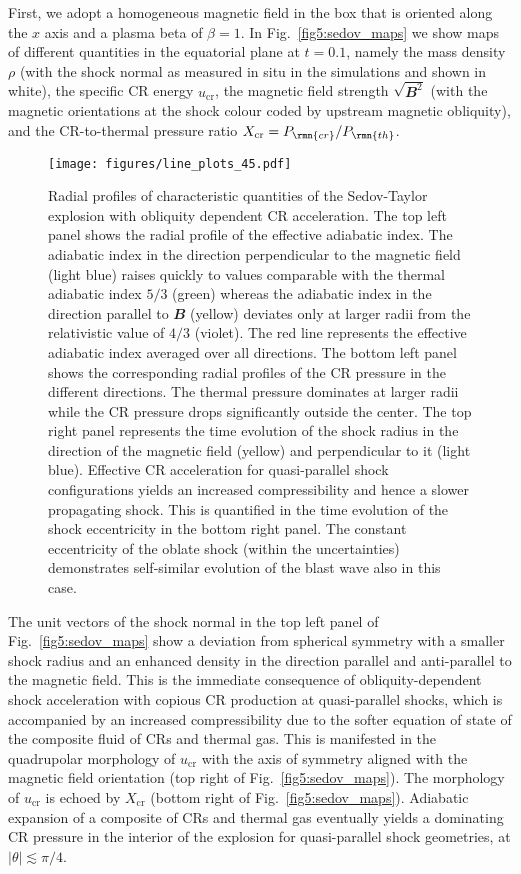 \documentclass[8pt,a4paper,usenatbib]{mnras}
\newcommand{\CR}{\rmn{cr}}
\renewcommand{\th}{\rmn{th}}
\newcommand{\vecbf}{\mathbfit}
\begin{document}
First, we adopt a homogeneous magnetic field in the box that is oriented along
the $x$ axis and a plasma beta of $\beta=1$. In Fig.~\ref{fig5:sedov_maps}
we show maps of different quantities in the equatorial plane at $t=0.1$, namely
the mass density $\rho$ (with the shock normal as measured in situ in the
simulations and shown in white), the specific CR energy $u_{\mathrm{cr}}$, the
magnetic field strength $\sqrt{\vecbf{B}^2}$ (with the magnetic orientations at
the shock colour coded by upstream magnetic obliquity), and the CR-to-thermal
pressure ratio $X_{\mathrm{cr}}=P_\CR/P_\th$.

\begin{figure*}
\centering
\texttt{[image: figures/line\_plots\_45.pdf]} 
\caption{Radial profiles of characteristic quantities of the Sedov-Taylor
  explosion with obliquity dependent CR acceleration. The top left panel shows
  the radial profile of the effective adiabatic index. The adiabatic index in
  the direction perpendicular to the magnetic field (light blue) raises quickly
  to values comparable with the thermal adiabatic index $5/3$ (green) whereas
  the adiabatic index in the direction parallel to $\vecbf{B}$ (yellow) deviates
  only at larger radii from the relativistic value of $4/3$ (violet). The red
  line represents the effective adiabatic index averaged over all
  directions. The bottom left panel shows the corresponding radial profiles of
  the CR pressure in the different directions.  The thermal pressure dominates
  at larger radii while the CR pressure drops significantly outside the
  center. The top right panel represents the time evolution of the shock radius
  in the direction of the magnetic field (yellow) and perpendicular to it (light
  blue). Effective CR acceleration for quasi-parallel shock configurations
  yields an increased compressibility and hence a slower propagating shock. This
  is quantified in the time evolution of the shock eccentricity in the bottom
  right panel. The constant eccentricity of the oblate shock (within the
  uncertainties) demonstrates self-similar evolution of the blast wave also in
  this case.}
\label{fig6:sedov_line_maps}
\end{figure*}  

The unit vectors of the shock normal in the top left panel of
Fig.~\ref{fig5:sedov_maps} show a deviation from spherical symmetry with a
smaller shock radius and an enhanced density in the direction parallel and
anti-parallel to the magnetic field. This is the immediate consequence of
obliquity-dependent shock acceleration with copious CR production at
quasi-parallel shocks, which is accompanied by an increased compressibility due
to the softer equation of state of the composite fluid of CRs and thermal gas.
This is manifested in the quadrupolar morphology of $u_{\mathrm{cr}}$ with the axis
of symmetry aligned with the magnetic field orientation (top right of
Fig.~\ref{fig5:sedov_maps}). The morphology of $u_{\mathrm{cr}}$ is echoed by
$X_{\mathrm{cr}}$ (bottom right of Fig.~\ref{fig5:sedov_maps}). Adiabatic
expansion of a composite of CRs and thermal gas eventually yields a dominating
CR pressure in the interior of the explosion for quasi-parallel shock
geometries, at $|\theta|\lesssim\pi/4$.
\end{document}
